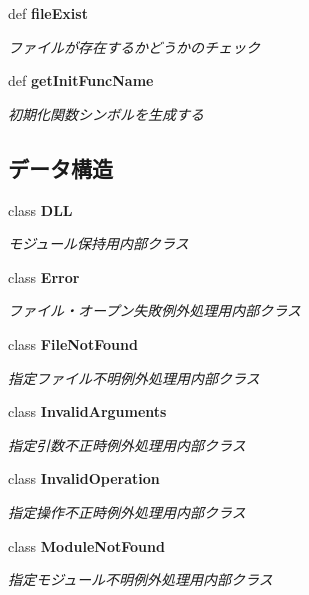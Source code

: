 \begin{CompactItemize}
def {\bf fileExist}
\begin{CompactList}\small\item\em ファイルが存在するかどうかのチェック \item\end{CompactList}\item 
def {\bf getInitFuncName}
\begin{CompactList}\small\item\em 初期化関数シンボルを生成する \item\end{CompactList}\end{CompactItemize}
\subsection*{データ構造}
\begin{CompactItemize}
\item 
class {\bf DLL}
\begin{CompactList}\small\item\em モジュール保持用内部クラス \item\end{CompactList}\item 
class {\bf Error}
\begin{CompactList}\small\item\em ファイル・オープン失敗例外処理用内部クラス \item\end{CompactList}\item 
class {\bf FileNotFound}
\begin{CompactList}\small\item\em 指定ファイル不明例外処理用内部クラス \item\end{CompactList}\item 
class {\bf InvalidArguments}
\begin{CompactList}\small\item\em 指定引数不正時例外処理用内部クラス \item\end{CompactList}\item 
class {\bf InvalidOperation}
\begin{CompactList}\small\item\em 指定操作不正時例外処理用内部クラス \item\end{CompactList}\item 
class {\bf ModuleNotFound}
\begin{CompactList}\small\item\em 指定モジュール不明例外処理用内部クラス \item\end{CompactList}\item 

\end{CompactItemize}
